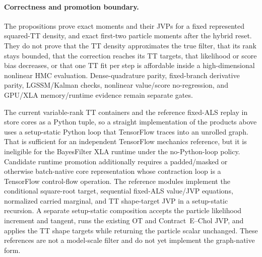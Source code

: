 \paragraph{Correctness and promotion boundary.}
The propositions prove exact moments and their JVPs for a fixed represented
squared-TT density, and exact first-two particle moments after the hybrid
reset.  They do not prove that the TT density approximates the true filter,
that its rank stays bounded, that the correction reaches its TT targets, that
likelihood or score bias decreases, or that one TT fit per step is affordable
inside a high-dimensional nonlinear HMC evaluation.  Dense-quadrature parity,
fixed-branch derivative parity, LGSSM/Kalman checks, nonlinear value/score
no-regression, and GPU/XLA memory/runtime evidence remain separate gates.

The current variable-rank TT containers and the reference fixed-ALS replay in
 store cores as a
Python tuple, so a
straight implementation of the products above uses a setup-static Python loop
that TensorFlow traces into an unrolled graph.  That is sufficient for an
independent TensorFlow mechanics reference, but it is ineligible for the
BayesFilter XLA runtime under the no-Python-loop policy.  Candidate runtime
promotion additionally requires a padded/masked or otherwise batch-native core
representation whose contraction loop is a TensorFlow control-flow operation.
The reference modules implement the conditional square-root target, sequential
fixed-ALS value/JVP equations, normalized carried marginal, and TT shape-target
JVP in a setup-static recursion.  A separate setup-static composition accepts
the particle likelihood increment and tangent, runs the existing OT and
Contract~E--Chol JVP, and applies the TT shape targets while returning the
particle scalar unchanged.  These references are not a model-scale filter and
do not yet implement the graph-native form.

